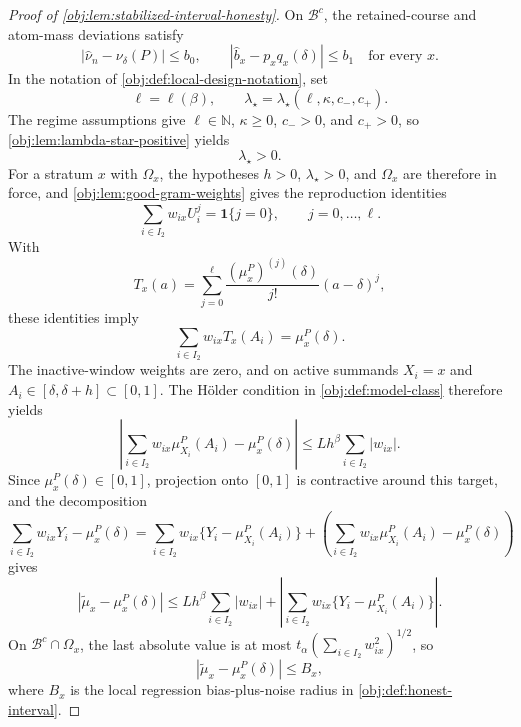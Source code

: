 \documentclass[11pt]{article}
\begin{document}
\begin{proof}[Proof of \cref{obj:lem:stabilized-interval-honesty}]
On \(\mathcal B^c\), the retained-course and atom-mass deviations satisfy
\[
        |\widehat\nu_n-\nu_\delta(P)|\le b_0,
        \qquad
        |\widehat b_x-p_xq_x(\delta)|\le b_1
        \quad\text{for every }x .
\]
In the notation of \cref{obj:def:local-design-notation}, set
\[
        \ell=\ell(\beta),
        \qquad
        \lambda_\star=\lambda_\star(\ell,\kappa,c_-,c_+).
\]
The regime assumptions give \(\ell\in\mathbb N\), \(\kappa\ge0\), \(c_->0\), and \(c_+>0\), so \cref{obj:lem:lambda-star-positive} yields
\[
        \lambda_\star>0 .
\]
For a stratum \(x\) with \(\Omega_x\), the hypotheses \(h>0\), \(\lambda_\star>0\), and \(\Omega_x\) are therefore in force, and \cref{obj:lem:good-gram-weights} gives the reproduction identities
\[
        \sum_{i\in I_2}w_{ix}U_i^j=\mathbf 1\{j=0\},
        \qquad j=0,\ldots,\ell .
\]
With
\[
        T_x(a)=\sum_{j=0}^{\ell}
        \frac{(\mu_x^P)^{(j)}(\delta)}{j!}(a-\delta)^j,
\]
these identities imply
\[
        \sum_{i\in I_2}w_{ix}T_x(A_i)=\mu_x^P(\delta).
\]
The inactive-window weights are zero, and on active summands \(X_i=x\) and \(A_i\in[\delta,\delta+h]\subset[0,1]\).  The Hölder condition in \cref{obj:def:model-class} therefore yields
\[
\left|
\sum_{i\in I_2}w_{ix}\mu_{X_i}^P(A_i)-\mu_x^P(\delta)
\right|
\le
Lh^\beta\sum_{i\in I_2}|w_{ix}|.
\]
Since \(\mu_x^P(\delta)\in[0,1]\), projection onto \([0,1]\) is contractive around this target, and the decomposition
\[
\sum_{i\in I_2}w_{ix}Y_i-\mu_x^P(\delta)
=
\sum_{i\in I_2}w_{ix}\{Y_i-\mu_{X_i}^P(A_i)\}
+
\left(\sum_{i\in I_2}w_{ix}\mu_{X_i}^P(A_i)-\mu_x^P(\delta)\right)
\]
gives
\[
\left|
\widetilde\mu_x-\mu_x^P(\delta)
\right|
\le
Lh^\beta\sum_{i\in I_2}|w_{ix}|
+
\left|
\sum_{i\in I_2}w_{ix}\{Y_i-\mu^P_{X_i}(A_i)\}
\right|.
\]
On \(\mathcal B^c\cap\Omega_x\), the last absolute value is at most
\(t_\alpha(\sum_{i\in I_2}w_{ix}^2)^{1/2}\), so
\[
\left|
\widetilde\mu_x-\mu_x^P(\delta)
\right|
\le
B_x,
\]
where \(B_x\) is the local regression bias-plus-noise radius in \cref{obj:def:honest-interval}. %


\end{proof}
\end{document}
